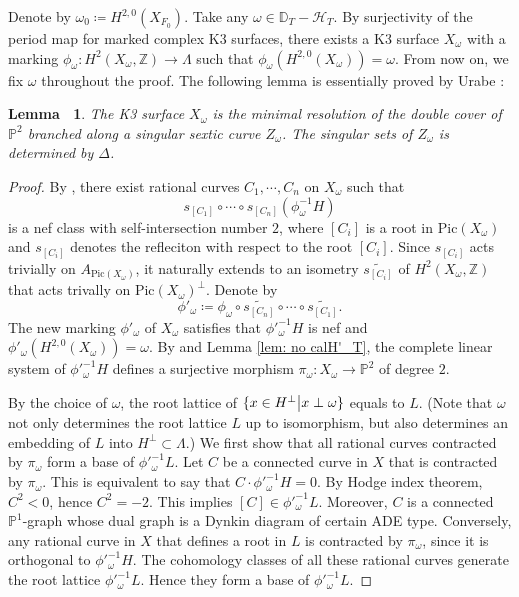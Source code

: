 \documentclass[12pt,reqno,a4paper]{amsart}
\newtheorem{lem}[thm]{Lemma~}
\theoremstyle{remark}
\theoremstyle{definition}
\begin{document}
Denote by $\omega_0\coloneqq H^{2,0}(X_{F_0})$.
Take any $\omega\in\mathbb{D}_T-\mathcal{H}_T$.
By surjectivity of the period map for marked complex K3 surfaces, there exists a K3 surface $X_\omega$ with a marking $\phi_\omega\colon H^2(X_\omega,\mathbb{Z})\to \Lambda$ such that $\phi_\omega(H^{2,0}(X_\omega))=\omega$.
From now on, we fix $\omega$ throughout the proof.
The following lemma is essentially proved by Urabe \cite[Theorem 1.16]{urabe1988combinations}:
\begin{lem}
\label{lem: X_omega determines Z(F)}
    The K3 surface $X_\omega$ is the minimal resolution of the double cover of $\mathbb{P}^2$ branched along a singular sextic curve $Z_\omega$.
    The singular sets of $Z_\omega$ is determined by $\Delta$.
\end{lem}
\begin{proof}
    By \cite[Chapter 8, \S 2, Corollary 2.9]{huybrechts2016lectures}, there exist rational curves $C_1,\cdots,C_n$ on $X_\omega$ such that 
    \begin{equation*}
        s_{[C_1]}\circ\cdots\circ s_{[C_n]}(\phi_\omega^{-1}H)
    \end{equation*}
    is a nef class with self-intersection number $2$, where $[C_i]$ is a root in $\mathrm{Pic}(X_\omega)$ and $s_{[C_i]}$ denotes the refleciton with respect to the root $[C_i]$.
    Since $s_{[C_i]}$ acts trivially on $A_{\mathrm{Pic}(X_\omega)}$, it naturally extends to an isometry $\widetilde{s_{[C_i]}}$ of $H^2(X_\omega,\mathbb{Z})$ that acts trivally on $\mathrm{Pic}(X_\omega)^\perp$. 
    Denote by 
    \begin{equation*}
        \phi'_\omega\coloneqq \phi_\omega\circ \widetilde{s_{[C_n]}}\circ\cdots\circ \widetilde{s_{[C_1]}}.
    \end{equation*}
    The new marking $\phi'_\omega$ of $X_\omega$ satisfies that $\phi'^{-1}_\omega H$ is nef and $\phi'_\omega(H^{2,0}(X_\omega))=\omega$.
    By \cite[Proposition 1.7]{urabe1988combinations} and Lemma \ref{lem: no calH'_T}, the complete linear system of $\phi'^{-1}_\omega H$ defines a surjective morphism $\pi_\omega\colon X_\omega\to \mathbb{P}^2$ of degree $2$.

    By the choice of $\omega$, the root lattice of $\{x\in H^\perp \big{|} x \perp \omega \}$ equals to $L$.  
    (Note that $\omega$ not only determines the root lattice $L$ up to isomorphism, but also determines an embedding of $L$ into $H^\perp\subset\Lambda$.)
    We first show that all rational curves contracted by $\pi_\omega$ form a base of $\phi'^{-1}_\omega L$.
    Let $C$ be a connected curve in $X$ that is contracted by $\pi_\omega$.
    This is equivalent to say that $C\cdot \phi'^{-1}_\omega H = 0$.
    By Hodge index theorem, $C^2<0$, hence $C^2=-2$. This implies $[C]\in \phi'^{-1}_\omega L$.
    Moreover, $C$ is a connected $\mathbb{P}^1$-graph whose dual graph is a Dynkin diagram of certain ADE type.
    Conversely, any rational curve in $X$ that defines a root in $L$ is contracted by $\pi_\omega$, since it is orthogonal to $\phi'^{-1}_\omega H$.
    The cohomology classes of all these rational curves generate the root lattice $\phi'^{-1}_\omega L$.
    Hence they form a base of $\phi'^{-1}_\omega L$.


\end{proof}
\end{document}
